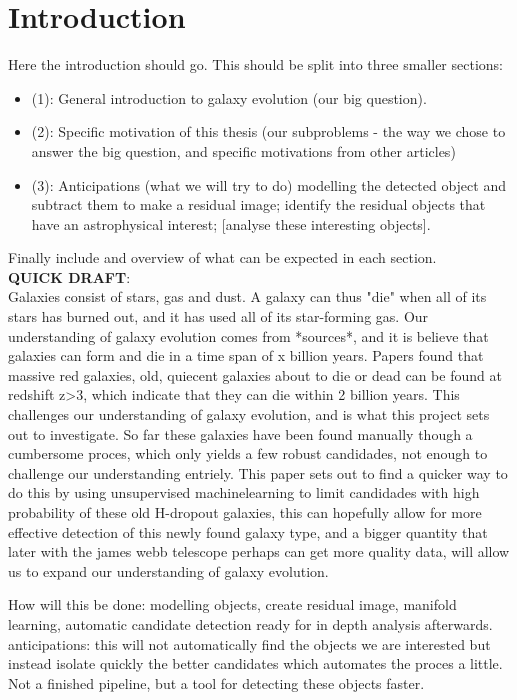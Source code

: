 \section{Introduction}
Here the introduction should go. This should be split into three smaller sections:
\begin{itemize}
    \item (1): General introduction to galaxy evolution (our big question).
    \item (2): Specific motivation of this thesis (our subproblems - the way we chose to answer the big question, and specific motivations from other articles)
    \item (3): Anticipations (what we will try to do)
    modelling the detected object and subtract them to make a residual image; 
    identify the residual objects that have an astrophysical interest; 
    [analyse these interesting objects]. 
\end{itemize}
Finally include and overview of what can be expected in each section.
\cite{Steinhardt_2020}
\cite{Wang_2019}
\cite{Alcalde_Pampliega_2019} \\


\textbf{QUICK DRAFT}: \\
Galaxies consist of stars, gas and dust. A galaxy can thus "die" when all of its stars has burned out, and it has used all of its star-forming gas. Our understanding of galaxy evolution comes from *sources*, and it is believe that galaxies can form and die in a time span of x billion years. Papers found that massive red galaxies, old, quiecent galaxies about to die or dead can be found at redshift z>3, which indicate that they can die within 2 billion years. This challenges our understanding of galaxy evolution, and is what this project sets out to investigate. So far these galaxies have been found manually though a cumbersome proces, which only yields a few robust candidades, not enough to challenge our understanding entriely. This paper sets out to find a quicker way to do this by using unsupervised machinelearning to limit candidades with high probability of these old H-dropout galaxies, this can hopefully allow for more effective detection of this newly found galaxy type, and a bigger quantity that later with the james webb telescope perhaps can get more quality data, will allow us to expand our understanding of galaxy evolution.

How will this be done: modelling objects, create residual image, manifold learning, automatic candidate detection ready for in depth analysis afterwards. anticipations: this will not automatically find the objects we are interested but instead isolate quickly the better candidates which automates the proces a little. Not a finished pipeline, but a tool for detecting these objects faster.
